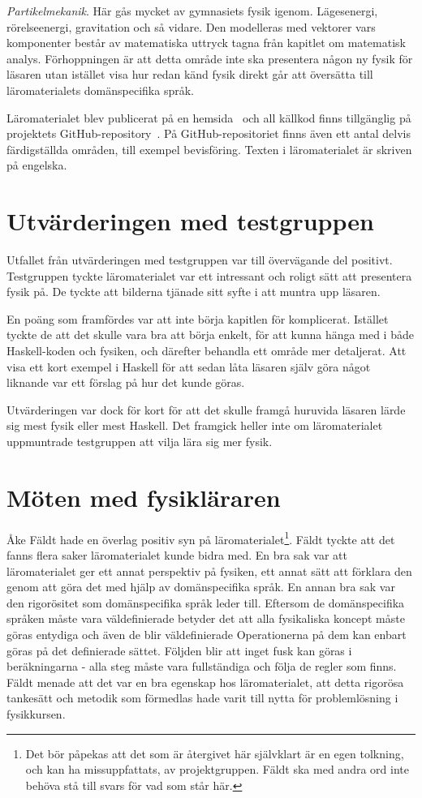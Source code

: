 \textit{Partikelmekanik}. Här gås mycket av gymnasiets fysik igenom.
Lägesenergi, rörelseenergi, gravitation och så vidare. Den modelleras med vektorer vars
komponenter består av matematiska uttryck tagna från kapitlet om matematisk
analys. Förhoppningen är att detta område inte ska presentera någon ny fysik för
läsaren utan istället visa hur redan känd fysik direkt går att översätta till läromaterialets domänspecifika språk.

Läromaterialet blev publicerat på en hemsida~\cite{LYAP} och all källkod finns
tillgänglig på projektets GitHub-repository~\cite{LYAP_repo}. På GitHub-repositoriet finns även ett antal delvis färdigställda områden, till exempel bevisföring. Texten i läromaterialet är skriven
på engelska.

\section{Utvärderingen med testgruppen}\label{sec:res_test}

Utfallet från utvärderingen med testgruppen var till övervägande del positivt.
Testgruppen tyckte läromaterialet var ett intressant och roligt sätt att
presentera fysik på. De tyckte att bilderna tjänade sitt syfte i att muntra upp
läsaren. 

En poäng som framfördes var att inte börja kapitlen för komplicerat. Istället
tyckte de att det skulle vara bra att börja enkelt, för att kunna hänga med i
både Haskell-koden och fysiken, och därefter behandla ett område mer
detaljerat. Att visa ett kort exempel i Haskell för att sedan låta läsaren själv
göra något liknande var ett förslag på hur det kunde göras.

Utvärderingen var dock för kort för att det skulle framgå huruvida läsaren lärde
sig mest fysik eller mest Haskell. Det framgick heller inte om läromaterialet
uppmuntrade testgruppen att vilja lära sig mer fysik.

\section{Möten med fysikläraren}\label{sec:res_ake}

Åke Fäldt hade en överlag positiv syn på läromaterialet\footnote{Det bör
påpekas att det som är återgivet här självklart är en egen tolkning, och kan ha
missuppfattats, av projektgruppen. Fäldt ska med andra ord inte behöva stå till
svars för vad som står här.}. Fäldt tyckte att det fanns flera saker
läromaterialet kunde bidra med. En bra sak var att läromaterialet ger ett annat
perspektiv på fysiken, ett annat sätt att förklara den genom att göra det med
hjälp av domänspecifika språk. En annan bra sak var den rigorösitet som
domänspecifika språk leder till. Eftersom de domänspecifika språken måste vara
väldefinierade betyder det att alla fysikaliska koncept måste göras entydiga och
även de blir väldefinierade Operationerna på dem kan enbart göras på det
definierade sättet. Följden blir att inget fusk kan göras i beräkningarna - alla
steg måste vara fullständiga och följa de regler som finns. Fäldt menade att det
var en bra egenskap hos läromaterialet, att detta rigorösa tankesätt och metodik
som förmedlas hade varit till nytta för problemlösning i fysikkursen.

